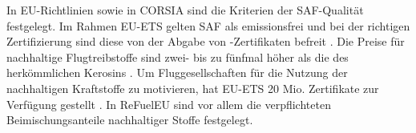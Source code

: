 %
%
%
%
%
%
In EU-Richtlinien sowie in CORSIA sind die Kriterien der SAF-Qualität festgelegt.
Im Rahmen EU-ETS gelten SAF als emissionsfrei und bei der richtigen Zertifizierung 
sind diese von der Abgabe von -Zertifikaten befreit \cite{icao_saf_conversion_2024}. 
Die Preise für nachhaltige Flugtreibstoffe sind zwei- bis zu fünfmal höher 
als die des herkömmlichen Kerosins \cite{iata_saf_2024}. %
Um Fluggesellschaften für die Nutzung der nachhaltigen Kraftstoffe zu motivieren, hat EU-ETS
20 Mio. Zertifikate zur Verfügung gestellt \cite{icao_saf_conversion_2024}. 
In ReFuelEU sind vor allem die verpflichteten Beimischungsanteile nachhaltiger Stoffe festgelegt.


